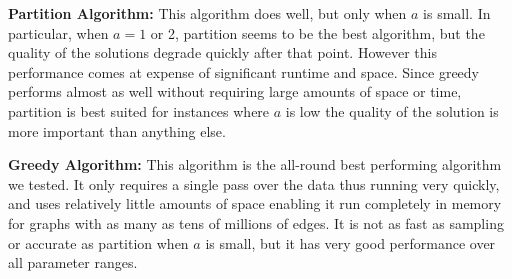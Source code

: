 \textbf{Partition Algorithm:} This algorithm does well, but only when $a$ is small.
In particular, when $a=1$ or 2, partition seems to be the best algorithm, but the quality
of the solutions degrade quickly after that point. However this performance comes at
expense of significant runtime and space. Since greedy performs almost as well without
requiring large amounts of space or time, partition is best suited for instances where
$a$ is low the quality of the solution is more important than anything else. \vs

\textbf{Greedy Algorithm:} This algorithm is the all-round best performing algorithm we tested.
It only requires a single pass over the data thus running very quickly,  and uses
relatively little amounts of space enabling it run completely in memory for graphs with
as many as tens of millions of edges. It is not as fast as sampling or accurate as partition
when $a$ is small, but it has very good performance over all parameter ranges. 
